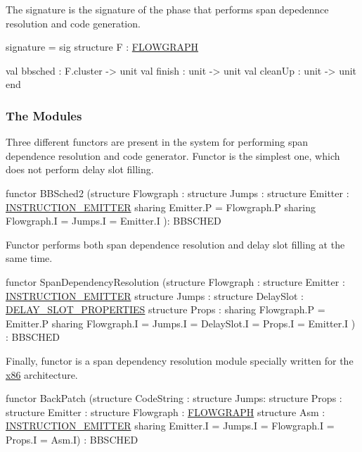 The signature  is the signature of the phase that performs
span depedennce resolution and code generation.
\begin{SML}
signature  = sig
  structure F : \href{cluster.html}{FLOWGRAPH}

  val bbsched : F.cluster -> unit
  val finish : unit -> unit
  val cleanUp : unit -> unit
end
\end{SML}

\subsubsection{The Modules}

Three different functors are present in the \MLRISC{} system for
performing span dependence resolution and code generator.
Functor  is the simplest one, which does not perform
delay slot filling.
\begin{SML}
functor BBSched2
  (structure Flowgraph : 
   structure Jumps : 
   structure Emitter : \href{mc.html}{INSTRUCTION_EMITTER}
     sharing Emitter.P = Flowgraph.P
     sharing Flowgraph.I = Jumps.I = Emitter.I
  ): BBSCHED 
\end{SML}

Functor  performs both span dependence
resolution and delay slot filling at the same time.
\begin{SML}
functor SpanDependencyResolution
  (structure Flowgraph : 
   structure Emitter : \href{mc.html}{INSTRUCTION_EMITTER}
   structure Jumps : 
   structure DelaySlot : \href{delayslots.html}{DELAY_SLOT_PROPERTIES}
   structure Props : 
     sharing Flowgraph.P = Emitter.P
     sharing Flowgraph.I = Jumps.I = DelaySlot.I = Props.I = Emitter.I
  ) : BBSCHED 
\end{SML}

Finally, functor  is a span dependency resolution
module specially written for the \href{x86.html}{x86} architecture.
\begin{SML}
functor BackPatch
  (structure CodeString : 
   structure Jumps: 
   structure Props : 
   structure Emitter : 
   structure Flowgraph : \href{cluster.html}{FLOWGRAPH}
   structure Asm : \href{asm.html}{INSTRUCTION_EMITTER}
      sharing Emitter.I = Jumps.I = Flowgraph.I = Props.I = Asm.I) : BBSCHED 
\end{SML}


